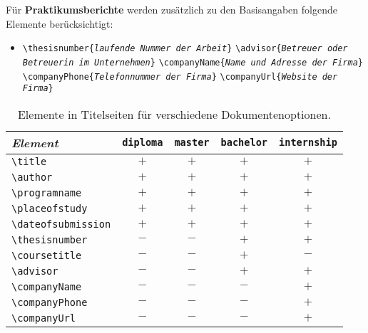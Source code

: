 \noindent Für \textbf{Praktikumsberichte} werden zusätzlich zu den Basisangaben folgende
Elemente berücksichtigt:
%
\begin{itemize}
\item[] %
\verb!\thesisnumber{!\texttt{\em laufende Nummer der Arbeit}\verb!}!%
\newline%
\verb!\advisor{!\texttt{\em Betreuer oder Betreuerin im Unternehmen}\verb!}! \newline%
\verb!\companyName{!\texttt{\em Name und Adresse der Firma}\verb!}! \newline%
\verb!\companyPhone{!\texttt{\em Telefonnummer der Firma}\verb!}! \newline%
\verb!\companyUrl{!\texttt{\em Website der Firma}\verb!}!
\end{itemize}

\begin{table}
\caption{Elemente in Titelseiten für verschiedene Dokumentenoptionen.}
\label{tab:TitelElemente}
\centering\small
\begin{tabular}{lcccc}
\emph{Element} & 
\texttt{diploma} &
\texttt{master} &
\texttt{bachelor} & 
\texttt{internship} 
\\
\hline
\verb!\title! 			& $+$ & $+$ & $+$ & $+$ \\
\verb!\author! 			& $+$ & $+$ & $+$ & $+$ \\
\verb!\programname! & $+$ & $+$ & $+$ & $+$ \\
\verb!\placeofstudy! 	& $+$ & $+$ & $+$ & $+$ \\
\verb!\dateofsubmission! 	& $+$ & $+$ & $+$ & $+$ \\
\verb!\thesisnumber! 			& $-$ & $-$ & $+$ & $+$ \\
\verb!\coursetitle! 	& $-$ & $-$ & $+$ & $-$ \\
\verb!\advisor! 		& $-$ & $-$ & $+$ & $+$ \\
\verb!\companyName! 			& $-$ & $-$ & $-$ & $+$ \\
\verb!\companyPhone! 	& $-$ & $-$ & $-$ & $+$ \\
\verb!\companyUrl! 	& $-$ & $-$ & $-$ & $+$ \\
\hline
\end{tabular}
\end{table}



